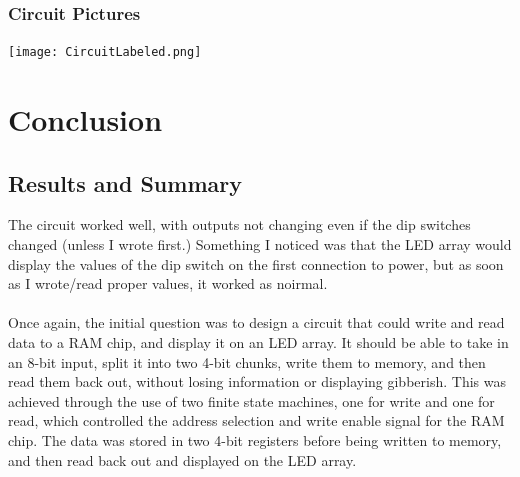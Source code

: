 \documentclass{article}
\begin{document}
        \subsubsection{Circuit Pictures}
        \texttt{[image: CircuitLabeled.png]}

    \section{Conclusion}  

        \subsection{Results and Summary} 
        The circuit worked well, with outputs not changing even if the dip switches changed (unless I wrote first.) 
        Something I noticed was that the LED array would display the values of the dip switch on the first connection to power, but as soon as I 
        wrote/read proper values, it worked as noirmal. \\\\
        Once again, the initial question was to design a circuit that could write and read data to a RAM chip, and display it on an LED array. It should be able to take in an 8-bit input, split it into two 4-bit chunks, write them to memory, and then read them back out,
        without losing information or displaying gibberish. This was achieved through the use of two finite state machines, one for write and one for read, which controlled the address selection and write enable signal for the RAM chip. The data was stored in two 4-bit registers before being written to memory, and then read back out and displayed on the LED array. 
    

        
\end{document}
